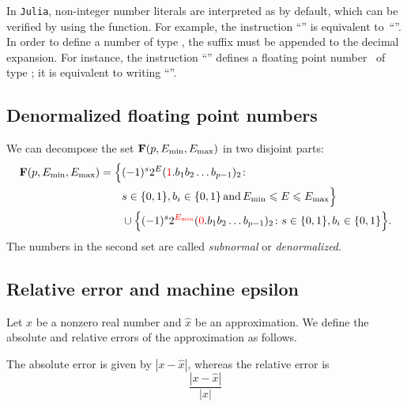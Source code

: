In \texttt{Julia}, non-integer number literals are interpreted as  by default,
which can be verified by using the  function.
For example, the instruction ``'' is equivalent to~``''.
In order to define a number of type ,
the suffix  must be appended to the decimal expansion.
For instance, the instruction ``'' defines a floating point number~ of type ;
it is equivalent to writing ``''.

\subsection{Denormalized floating point numbers}%
\label{sub:defining_a_unique_representation}
We can decompose the set $\mathbf F(p, E_{\min}, E_{\max})$ in two disjoint parts:
\begin{align*}
    \label{eq:decomposition_normalized_denormalized}%
    \floating (p, E_{\min}, E_{\max})
    &= \Bigl\{ (-1)^s 2^E (\textcolor{red}{1}. b_1 b_2 \dots b_{p-1})_2 \colon \\
    & \qquad s \in \{0, 1\}, b_i \in \{0, 1\} \, \text{and} \, E_{\min} \leq E \leq E_{\max} \Bigr\} \\
    &\qquad \cup \Bigl\{  (-1)^s 2^{\textcolor{red}{E_{\min}}} (\textcolor{red}{0}. b_1 b_2 \dots b_{p-1})_2 \colon
     s \in \{0, 1\}, b_i \in \{0, 1\} \Bigr\}.
\end{align*}
The numbers in the second set are called \emph{subnormal} or \emph{denormalized}.

\subsection{Relative error and machine epsilon}%
\label{sub:relative_error_and_epsilon_machine}
Let $x$ be a nonzero real number and $\widehat x$ be an approximation.
We define the absolute and relative errors of the approximation as follows.
\begin{definition}
    The absolute error is given by $|x - \widehat x|$,
    whereas the relative error is
    \[
        \frac{|x - \widehat x|}{|x|}
    \]
\end{definition}

